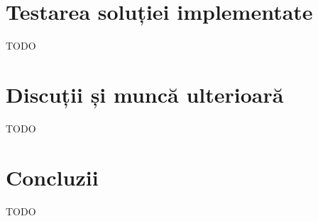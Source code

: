 \documentclass[12pt, a4paper, oneside]{article}
\begin{document}
\newpage
\section{Testarea soluției implementate} \label{TestareAplicatie}
TODO


\newpage
\section{Discuții și muncă ulterioară} \label{Discutii}
TODO



\newpage
\section{Concluzii} \label{Concluzii}
TODO



\newpage
{}


\nocite{*}
\end{document}
